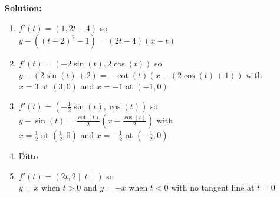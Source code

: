 \documentclass{report}
\newcommand{\solution}{\textbf{Solution: }}
\begin{document}
\begin{enumerate}
	\solution 
	\begin{enumerate}
		\item $f'(t) = (1, 2t-4)$ so \\
			$y-((t-2)^2-1) = (2t-4)(x-t)$
		\item $f'(t) = (-2\sin(t), 2\cos(t))$ so \\
			$y-(2\sin(t)+2) = -\cot(t)(x-(2\cos(t)+1))$ with \\
			$x = 3$ at $(3,0)$ and $x = -1$ at $(-1,0)$
		\item $f'(t) = (-\frac{1}{2}\sin(t), \cos(t))$ so \\
			$y-\sin(t) = \frac{\cot(t)}{2}(x-\frac{\cos(t)}{2})$ with \\
			$x = \frac{1}{2}$ at $(\frac{1}{2}, 0)$ and 
			$x = -\frac{1}{2}$ at $(-\frac{1}{2}, 0)$
		\item Ditto 
		\item $f'(t) = (2t, 2\|t\|)$ so \\
			$y=x$ when $t>0$ and $y=-x$ when $t<0$ 
			with no tangent line at $t=0$
	\end{enumerate}
\end{enumerate}
\end{document}
